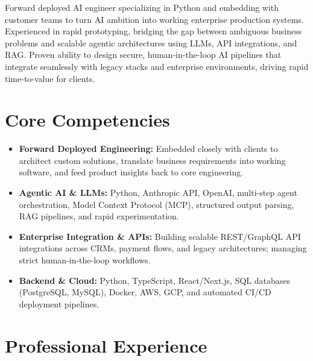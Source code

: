 \documentclass[11pt,a4paper,sans]{moderncv}
\begin{document}
\makecvtitle

Forward deployed AI engineer specializing in Python and embedding with customer teams to turn AI ambition into working enterprise production systems. Experienced in rapid prototyping, bridging the gap between ambiguous business problems and scalable agentic architectures using LLMs, API integrations, and RAG. Proven ability to design secure, human-in-the-loop AI pipelines that integrate seamlessly with legacy stacks and enterprise environments, driving rapid time-to-value for clients.

\section{Core Competencies}
\begin{itemize}
\item \textbf{Forward Deployed Engineering:} Embedded closely with clients to architect custom solutions, translate business requirements into working software, and feed product insights back to core engineering.
\item \textbf{Agentic AI \& LLMs:} Python, Anthropic API, OpenAI, multi-step agent orchestration, Model Context Protocol (MCP), structured output parsing, RAG pipelines, and rapid experimentation.
\item \textbf{Enterprise Integration \& APIs:} Building scalable REST/GraphQL API integrations across CRMs, payment flows, and legacy architectures; managing strict human-in-the-loop workflows.
\item \textbf{Backend \& Cloud:} Python, TypeScript, React/Next.js, SQL databases (PostgreSQL, MySQL), Docker, AWS, GCP, and automated CI/CD deployment pipelines.
\end{itemize}

\section{Professional Experience}
\end{document}

